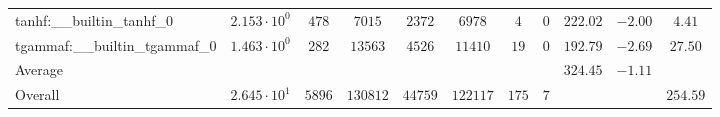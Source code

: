 \begin{tabular}{|l|c|c|c|c|c|c|c|c|c|c|}
tanhf:\_\_builtin\_tanhf\_0               & $ 2.153 \cdot 10^{0}  $ & $ 478    $ & $ 7015   $ & $ 2372  $ & $ 6978   $ & $ 4   $ & $ 0 $ & $ 222.02      $ & $ -2.00   $ & $ 4.41    $ \\
tgammaf:\_\_builtin\_tgammaf\_0           & $ 1.463 \cdot 10^{0}  $ & $ 282    $ & $ 13563  $ & $ 4526  $ & $ 11410  $ & $ 19  $ & $ 0 $ & $ 192.79      $ & $ -2.69   $ & $ 27.50   $ \\
\hline
Average                                   & $                     $ & $        $ & $        $ & $       $ & $        $ & $     $ & $   $ & $ 324.45      $ & $ -1.11   $ & $         $ \\
\hline
Overall                                   & $ 2.645 \cdot 10^{1}  $ & $ 5896   $ & $ 130812 $ & $ 44759 $ & $ 122117 $ & $ 175 $ & $ 7 $ & $             $ & $         $ & $ 254.59  $ \\
\hline
\end{tabular}
